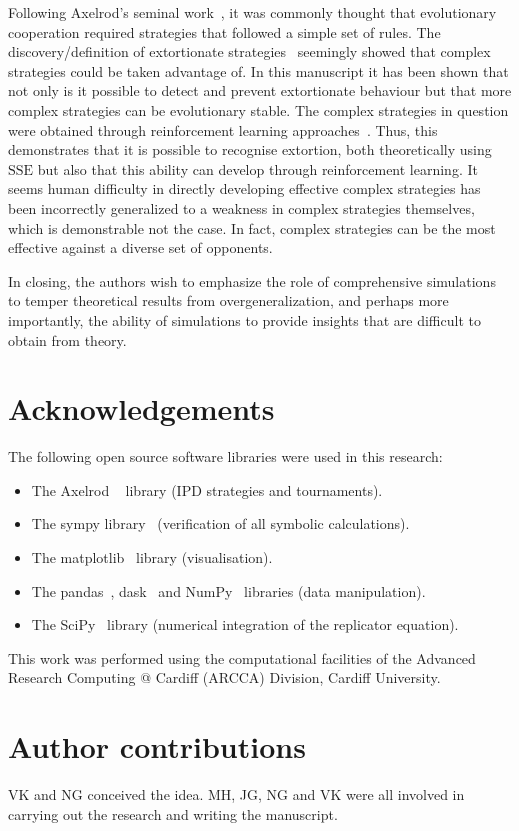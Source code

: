 \documentclass[a4paper]{article}
\newcommand{\SSe}{\text{SSE}}
\begin{document}
Following Axelrod's seminal work~\cite{Axelrod1980, Axelrod1980a}, it was
commonly thought that evolutionary cooperation required strategies that followed
a simple set of rules. The discovery/definition of extortionate
strategies~\cite{Press2012} seemingly showed that complex strategies could be
taken advantage of. In this manuscript it has been shown that not only is it
possible to detect and prevent extortionate behaviour but that more complex
strategies can be evolutionary stable. The complex strategies in question were
obtained through reinforcement learning approaches~\cite{Harper2017, Moran1707}.
Thus, this demonstrates that it is possible to recognise extortion, both
theoretically using \(\SSe\) but also that this ability can develop through
reinforcement learning. It seems human difficulty in directly developing
effective complex strategies has been incorrectly generalized to a weakness
in complex strategies themselves, which is demonstrable not the case. In fact,
complex strategies can be the most effective against a diverse set of opponents.

In closing, the authors wish to emphasize the role of comprehensive simulations to temper
theoretical results from overgeneralization, and perhaps more importantly, the
ability of simulations to provide insights that are difficult to obtain from theory.

\section*{Acknowledgements}

The following open source software libraries were used in this research:

\begin{itemize}
    \item The Axelrod ~\cite{Knight2016, Knight2018} library (IPD strategies and
        tournaments).
    \item The sympy library~\cite{Meurer2017} (verification of all symbolic
        calculations).
    \item The matplotlib~\cite{Droettboom2018} library (visualisation).
    \item The pandas~\cite{Structures2010}, dask~\cite{Dask2016} and
        NumPy~\cite{Oliphant2015} libraries (data manipulation).
    \item The SciPy~\cite{Jones2001} library (numerical integration of the
        replicator equation).
\end{itemize}

This work was performed using the computational facilities of the Advanced
Research Computing @ Cardiff (ARCCA) Division, Cardiff University.

\section*{Author contributions}

VK and NG conceived the idea. MH, JG, NG and VK were all involved in carrying
out the research and writing the manuscript.

\printbibliography



\end{document}
